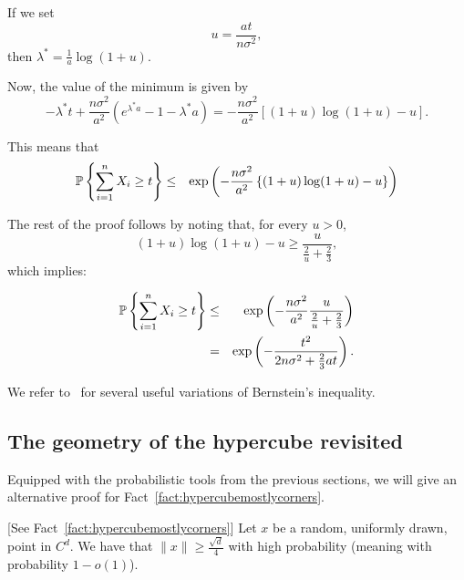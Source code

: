 {If we set
\begin{equation}
u = \frac{at}{n\sigma^2},
\end{equation}
then $\lambda^* = \frac{1}{a}\log(1 + u)$.

Now, the value of the minimum is given by
\[
 -\lambda^* t + \frac{n\sigma^2}{a^2} (e^{\lambda^*a} -1 -\lambda^*a) = -\frac{n\sigma^2}{a^2}\left[(1+u)\log(1+u) - u  \right].
\]



This means that
\begin{eqnarray*}
{\mathbb{P}}\left\{ \sum_{i=1}^n X_i \geq t \right\} &\leq& \exp\left(-\frac{n\sigma^2}{a^2}\left\{(1+u)\log(1+u)-u\right\} \right)
\end{eqnarray*}

The rest of the proof follows by noting that, for every $u>0$,
\begin{equation}
\left(1+u\right)\log(1+u) - u \geq \frac{u}{\frac2u+\frac{2}{3}},
\end{equation}
which implies:

\begin{eqnarray*}
{\mathbb{P}}\left\{ \sum_{i=1}^n X_i \geq t \right\} &\leq& \exp\left(-\frac{n\sigma^2}{a^2}\frac{u}{\frac{2}{u}+\frac{2}{3}} \right)\\
&=& \exp\left(-\frac{t^2}{2n\sigma^2 + \frac{2}{3}at} \right).
\end{eqnarray*}

}


We refer to~\cite{vershynin2018} for several useful variations of Bernstein's inequality.




\subsection{The geometry of the hypercube revisited} \label{ss:hypercube1}

Equipped with the probabilistic tools from the previous sections, we will give an alternative proof for Fact~\ref{fact:hypercubemostlycorners}.

\begin{theorem}\label{thm:hypercubemostlycorners}[See Fact~\ref{fact:hypercubemostlycorners}]
Let $x$ be a random, uniformly drawn, point in $C^d$. We have that $\|x\|\geq \frac{\sqrt{d}}4$ with high probability (meaning with probability $1-o(1)$).
\end{theorem}


